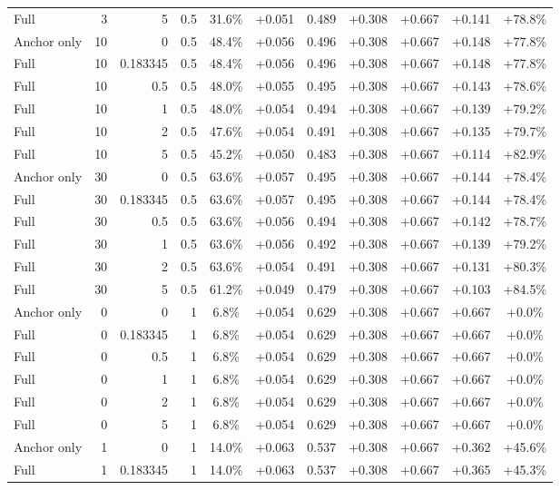 \begin{table}[htbp]
\begin{tabular}{lrrrccccccc}
Full & 3 & 5 & 0.5 & 31.6\% & +0.051 & 0.489 & +0.308 & +0.667 & +0.141 & +78.8\% \\
Anchor only & 10 & 0 & 0.5 & 48.4\% & +0.056 & 0.496 & +0.308 & +0.667 & +0.148 & +77.8\% \\
Full & 10 & 0.183345 & 0.5 & 48.4\% & +0.056 & 0.496 & +0.308 & +0.667 & +0.148 & +77.8\% \\
Full & 10 & 0.5 & 0.5 & 48.0\% & +0.055 & 0.495 & +0.308 & +0.667 & +0.143 & +78.6\% \\
Full & 10 & 1 & 0.5 & 48.0\% & +0.054 & 0.494 & +0.308 & +0.667 & +0.139 & +79.2\% \\
Full & 10 & 2 & 0.5 & 47.6\% & +0.054 & 0.491 & +0.308 & +0.667 & +0.135 & +79.7\% \\
Full & 10 & 5 & 0.5 & 45.2\% & +0.050 & 0.483 & +0.308 & +0.667 & +0.114 & +82.9\% \\
Anchor only & 30 & 0 & 0.5 & 63.6\% & +0.057 & 0.495 & +0.308 & +0.667 & +0.144 & +78.4\% \\
Full & 30 & 0.183345 & 0.5 & 63.6\% & +0.057 & 0.495 & +0.308 & +0.667 & +0.144 & +78.4\% \\
Full & 30 & 0.5 & 0.5 & 63.6\% & +0.056 & 0.494 & +0.308 & +0.667 & +0.142 & +78.7\% \\
Full & 30 & 1 & 0.5 & 63.6\% & +0.056 & 0.492 & +0.308 & +0.667 & +0.139 & +79.2\% \\
Full & 30 & 2 & 0.5 & 63.6\% & +0.054 & 0.491 & +0.308 & +0.667 & +0.131 & +80.3\% \\
Full & 30 & 5 & 0.5 & 61.2\% & +0.049 & 0.479 & +0.308 & +0.667 & +0.103 & +84.5\% \\
Anchor only & 0 & 0 & 1 & 6.8\% & +0.054 & 0.629 & +0.308 & +0.667 & +0.667 & +0.0\% \\
Full & 0 & 0.183345 & 1 & 6.8\% & +0.054 & 0.629 & +0.308 & +0.667 & +0.667 & +0.0\% \\
Full & 0 & 0.5 & 1 & 6.8\% & +0.054 & 0.629 & +0.308 & +0.667 & +0.667 & +0.0\% \\
Full & 0 & 1 & 1 & 6.8\% & +0.054 & 0.629 & +0.308 & +0.667 & +0.667 & +0.0\% \\
Full & 0 & 2 & 1 & 6.8\% & +0.054 & 0.629 & +0.308 & +0.667 & +0.667 & +0.0\% \\
Full & 0 & 5 & 1 & 6.8\% & +0.054 & 0.629 & +0.308 & +0.667 & +0.667 & +0.0\% \\
Anchor only & 1 & 0 & 1 & 14.0\% & +0.063 & 0.537 & +0.308 & +0.667 & +0.362 & +45.6\% \\
Full & 1 & 0.183345 & 1 & 14.0\% & +0.063 & 0.537 & +0.308 & +0.667 & +0.365 & +45.3\% \\

\end{tabular}
\end{table}
